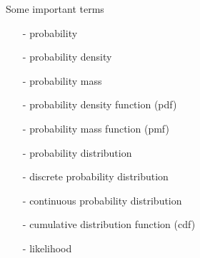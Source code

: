 \documentclass[english,t]{beamer}
\begin{document}
\begin{frame}{Some important terms}
  
  \begin{itemize}
  \item[-] probability
  \item[-] probability density
  \item[-] probability mass
  \item[-] probability density function (pdf)
  \item[-] probability mass function (pmf)
  \item[-] probability distribution
  \item[-] discrete probability distribution
  \item[-] continuous probability distribution
  \item[-] cumulative distribution function (cdf)
  \item[-] likelihood
  \end{itemize}
  
\end{frame}
  
\end{document}
